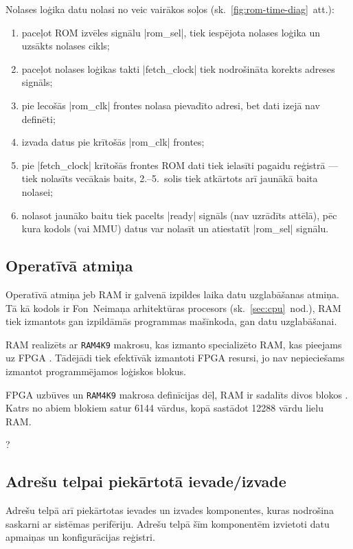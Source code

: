 	\pagebreak[2]
	Nolases loģika datu nolasi no  veic vairākos soļos (sk.~\ref{fig:rom-time-diag}~att.):
	\begin{enumerate}
		\item paceļot ROM izvēles signālu |rom_sel|, tiek iespējota nolases
			loģika un uzsākts nolases cikls;
		\item paceļot nolases loģikas takti |fetch_clock| 
			tiek nodrošināta korekts adreses signāls;
		\item pie lecošās |rom_clk| frontes  nolasa pievadīto adresi,
			bet dati izejā nav definēti;
		\item {} izvada datus pie krītošās |rom_clk|	frontes;
		\item pie |fetch_clock| krītošās frontes ROM dati tiek ielasīti
			pagaidu reģistrā --- tiek nolasīts vecākais baits, 
			2.--5.~solis tiek atkārtots arī jaunākā baita nolasei;
		\item nolasot jaunāko baitu tiek pacelts |ready| signāls
			(nav uzrādīts attēlā), pēc kura kodols (vai MMU) datus var
			nolasīt un atiestatīt |rom_sel| signālu.
	\end{enumerate}
	
	

\subsection{Operatīvā atmiņa} \label{sec:ram}
	Operatīvā atmiņa jeb RAM ir galvenā izpildes laika datu uzglabāšanas
	atmiņa. Tā kā kodols ir Fon~Neimaņa arhitektūras procesors
	(sk.~\ref{sec:cpu}~nod.), RAM tiek izmantots gan izpildāmās
	programmas mašīnkoda, gan datu uzglabāšanai.
	
	RAM realizēts ar \texttt{RAM4K9} makrosu, kas izmanto specializēto
	RAM, kas pieejams uz  FPGA \cite{RAM4K9}.
	Tādējādi tiek
	efektīvāk izmantoti FPGA resursi, jo nav nepieciešams izmantot
	programmējamos loģiskos blokus.
	
	 FPGA uzbūves un \texttt{RAM4K9} makrosa
	definīcijas dēļ, RAM ir sadalīts divos blokos \cite{RAM4K9}. 
	Katrs no abiem blokiem satur 6144 vārdus,
	kopā sastādot 12288 vārdu lielu RAM.
	
	\todo ?
	

\subsection{Adrešu telpai piekārtotā ievade/izvade}
	Adrešu telpā arī piekārtotas ievades un izvades komponentes,
	kuras nodrošina saskarni ar sistēmas perifēriju. Adrešu telpā šīm
	komponentēm izvietoti datu apmaiņas un konfigurācijas reģistri.
	
